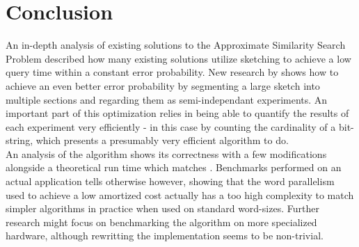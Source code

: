 \section{Conclusion}
An in-depth analysis of existing solutions to the Approximate Similarity Search Problem described how many existing solutions utilize sketching to achieve a low query time within a constant error probability. New research by \citep{fast-similarity-search} shows how to achieve an even better error probability by segmenting a large sketch into multiple sections and regarding them as semi-independant experiments. An important part of this optimization relies in being able to quantify the results of each experiment very efficiently - in this case by counting the cardinality of a bit-string, which \citep{fast-similarity-search} presents a presumably very efficient algorithm to do.\\
An analysis of the algorithm shows its correctness with a few modifications alongside a theoretical run time which matches \cite{fast-similarity-search}. Benchmarks performed on an actual application tells otherwise however, showing that the word parallelism used to achieve a low amortized cost actually has a too high complexity to match simpler algorithms in practice when used on standard word-sizes. Further research might focus on benchmarking the algorithm on more specialized hardware, although rewritting the implementation seems to be non-trivial.
